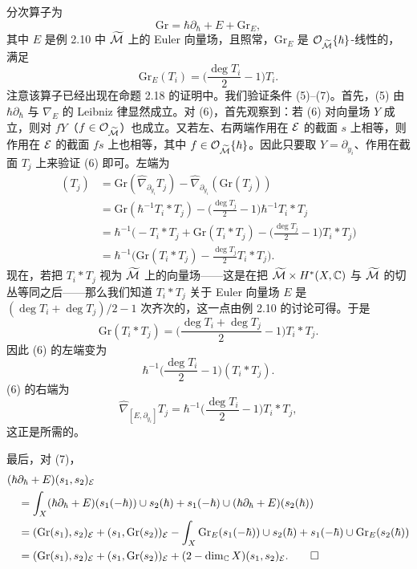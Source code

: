 \begin{example}
分次算子为
\[
\mathrm{Gr}=\hbar\partial_\hbar+E+\mathrm{Gr}_E,
\]
其中 $E$ 是例 2.10 中 $\widetilde{\mathcal{M}}$ 上的 Euler 向量场，且照常，$\mathrm{Gr}_E$ 是 $\mathcal{O}_{\widetilde{\mathcal{M}}}\{\hbar\}$-线性的，满足
\[
\mathrm{Gr}_E(T_i)=\Big(\frac{\deg T_i}{2}-1\Big)T_i.
\]
注意该算子已经出现在命题 2.18 的证明中。我们验证条件 (5)–(7)。首先，(5) 由 $\hbar\partial_\hbar$ 与 $\nabla_E$ 的 Leibniz 律显然成立。对 (6)，首先观察到：若 (6) 对向量场 $Y$ 成立，则对 $fY$（$f\in\mathcal{O}_{\widetilde{\mathcal{M}}}$）也成立。又若左、右两端作用在 $\mathcal{E}$ 的截面 $s$ 上相等，则作用在 $\mathcal{E}$ 的截面 $fs$ 上也相等，其中 $f\in\mathcal{O}_{\widetilde{\mathcal{M}}}\{\hbar\}$。因此只要取 $Y=\partial_{y_i}$、作用在截面 $T_j$ 上来验证 (6) 即可。左端为
\begin{align*}
[\mathrm{Gr},\widehat{\nabla}_{\partial_{y_i}}](T_j)
&= \mathrm{Gr}(\widehat{\nabla}_{\partial_{y_i}}T_j)-\widehat{\nabla}_{\partial_{y_i}}(\mathrm{Gr}(T_j))\\
&= \mathrm{Gr}(\hbar^{-1}T_i*T_j)-\Big(\frac{\deg T_j}{2}-1\Big)\hbar^{-1}T_i*T_j\\
&= \hbar^{-1}\Big(-T_i*T_j+\mathrm{Gr}(T_i*T_j)-\Big(\frac{\deg T_j}{2}-1\Big)T_i*T_j\Big)\\
&= \hbar^{-1}\Big(\mathrm{Gr}(T_i*T_j)-\frac{\deg T_j}{2}T_i*T_j\Big).
\end{align*}
现在，若把 $T_i*T_j$ 视为 $\widetilde{\mathcal{M}}$ 上的向量场——这是在把 $\widetilde{\mathcal{M}}\times H^*(X,\mathbb{C})$ 与 $\widetilde{\mathcal{M}}$ 的切丛等同之后——那么我们知道 $T_i*T_j$ 关于 Euler 向量场 $E$ 是 $(\deg T_i+\deg T_j)/2-1$ 次齐次的，这一点由例 2.10 的讨论可得。于是
\[
\mathrm{Gr}(T_i*T_j)=\Big(\frac{\deg T_i+\deg T_j}{2}-1\Big)T_i*T_j.
\]
因此 (6) 的左端变为
\[
\hbar^{-1}\Big(\frac{\deg T_i}{2}-1\Big)(T_i*T_j).
\]
(6) 的右端为
\[
\widehat{\nabla}_{[E,\partial_{y_i}]}T_j=\hbar^{-1}\Big(\frac{\deg T_i}{2}-1\Big)T_i*T_j,
\]
这正是所需的。

最后，对 (7)，
\begin{align*}
&(\hbar\partial_\hbar+E)(s_1,s_2)_{\mathcal{E}}\\
&\quad=\int_X (\hbar\partial_\hbar+E)(s_1(-\hbar))\cup s_2(\hbar)+s_1(-\hbar)\cup(\hbar\partial_\hbar+E)(s_2(\hbar))\\
&\quad=(\mathrm{Gr}(s_1),s_2)_{\mathcal{E}}+(s_1,\mathrm{Gr}(s_2))_{\mathcal{E}}-\int_X \mathrm{Gr}_E(s_1(-\hbar))\cup s_2(\hbar)+s_1(-\hbar)\cup\mathrm{Gr}_E(s_2(\hbar))\\
&\quad=(\mathrm{Gr}(s_1),s_2)_{\mathcal{E}}+(s_1,\mathrm{Gr}(s_2))_{\mathcal{E}}+(2-\dim_{\mathbb{C}} X)(s_1,s_2)_{\mathcal{E}}.\qedhere
\end{align*}
\end{example}

